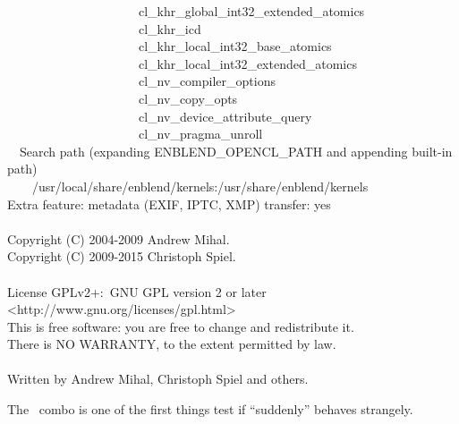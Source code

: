 \begin{exemplar}
\begin{maxipage}
\begin{terminal}
        ~~~~~~~~~~~~~~~~~~~~~cl\_khr\_global\_int32\_extended\_atomics \\
        ~~~~~~~~~~~~~~~~~~~~~cl\_khr\_icd \\
        ~~~~~~~~~~~~~~~~~~~~~cl\_khr\_local\_int32\_base\_atomics \\
        ~~~~~~~~~~~~~~~~~~~~~cl\_khr\_local\_int32\_extended\_atomics \\
        ~~~~~~~~~~~~~~~~~~~~~cl\_nv\_compiler\_options \\
        ~~~~~~~~~~~~~~~~~~~~~cl\_nv\_copy\_opts \\
        ~~~~~~~~~~~~~~~~~~~~~cl\_nv\_device\_attribute\_query \\
        ~~~~~~~~~~~~~~~~~~~~~cl\_nv\_pragma\_unroll \\
        ~~Search path (expanding ENBLEND\_OPENCL\_PATH and appending built-in path) \\
        ~~~~/usr/local/share/enblend/kernels:/usr/share/enblend/kernels \\
        Extra feature: metadata (EXIF, IPTC, XMP) transfer: yes \\
        ~ \\
        Copyright (C) 2004-2009 Andrew Mihal. \\
        Copyright (C) 2009-2015 Christoph Spiel. \\
        ~ \\
        License GPLv2+:~GNU GPL version 2 or later <http://www.gnu.org/licenses/gpl.html> \\
        This is free software: you are free to change and redistribute it. \\
        There is NO WARRANTY, to the extent permitted by law. \\
        ~ \\
        Written by Andrew Mihal, Christoph Spiel and others.
    \end{terminal}
  \end{maxipage}

  \caption[Output of ]%
          {\label{ex:option-version-verbose}%
            Example output of \appcmd{} when called with options 
            and~ together.}
\end{exemplar}

The ~combo is one of the first things test if \appcmd{} ``suddenly''
behaves strangely.

